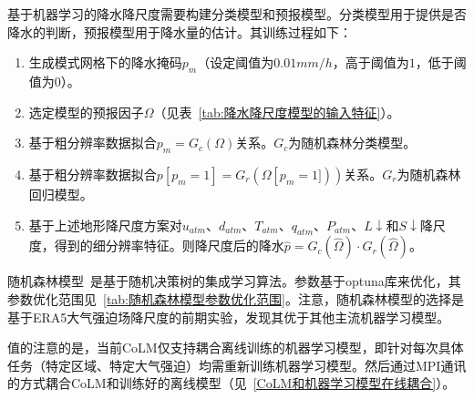 基于机器学习的降水降尺度需要构建分类模型和预报模型。分类模型用于提供是否降水的判断，预报模型用于降水量的估计。其训练过程如下：

\begin{enumerate}
    \item 生成模式网格下的降水掩码$p_{m}$（设定阈值为$0.01mm/h$，高于阈值为$1$，低于阈值为$0$）。
    \item 选定模型的预报因子$\Omega$（见表~\ref{tab:降水降尺度模型的输入特征}）。
    \item 基于粗分辨率数据拟合$p_{m}=G_{c}\left(\Omega\right)$关系。$G_{c}$为随机森林分类模型。
    \item 基于粗分辨率数据拟合$p[p_{m}=1]=G_{r}\left(\Omega\left[p_{m}=1]\right)\right)$关系。$G_{r}$为随机森林回归模型。
    \item 基于上述地形降尺度方案对$u_{atm}$、$d_{atm}$、$T_{atm}$、$q_{atm}$、$P_{atm}$、$L\downarrow$和$S\downarrow$降尺度，得到的细分辨率特征。则降尺度后的降水$\hat{p}=G_{c}\left(\hat{\Omega}\right) \cdot G_{r}\left(\hat{\Omega}\right)$。
\end{enumerate}

随机森林模型~\citep{rf2001}是基于随机决策树的集成学习算法。参数基于optuna库来优化，其参数优化范围见~\ref{tab:随机森林模型参数优化范围}。注意，随机森林模型的选择是基于ERA5大气强迫场降尺度的前期实验，发现其优于其他主流机器学习模型。

值的注意的是，当前CoLM仅支持耦合离线训练的机器学习模型，即针对每次具体任务（特定区域、特定大气强迫）均需重新训练机器学习模型。然后通过MPI通讯的方式耦合CoLM和训练好的离线模型（见~\ref{CoLM和机器学习模型在线耦合}）。

